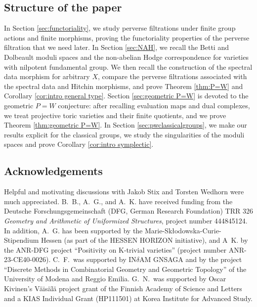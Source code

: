 \documentclass[11pt, a4paper]{amsart}
\theoremstyle{definition}
\theoremstyle{myitemstyle}
\begin{document}
\subsection*{Structure of the paper}
In Section \ref{sec:functoriality}, we study perverse filtrations under finite group actions and finite morphisms, proving the functoriality properties of the perverse filtration that we need later. In Section \ref{sec:NAH}, we recall the Betti and Dolbeault moduli spaces and the non-abelian Hodge correspondence for varieties with nilpotent fundamental group. We then recall the construction of the spectral data morphism for arbitrary $X$, compare the perverse filtrations associated with the spectral data and Hitchin morphisms, and prove Theorem \ref{thm:P=W} and Corollary \ref{cor:intro general type}. Section \ref{sec:geometric P=W} is devoted to the geometric $P=W$ conjecture: after recalling evaluation maps and dual complexes, we treat projective toric varieties and their finite quotients, and we prove Theorem \ref{thm:geometric P=W}. In Section \ref{sec:pwclassicalgroups}, we make our results explicit for the classical groups, we study the singularities of the moduli spaces and prove Corollary \ref{cor:intro symplectic}.

\subsection*{Acknowledgements}
Helpful and motivating discussions with Jakob Stix and Torsten Wedhorn were much appreciated. 
B.~B., A.~G., and A.~K. have  received funding from the Deutsche For\-schungs\-gemeinschaft (DFG, German Research Foundation) TRR 326 \emph{Geometry and Arithmetic of Uniformized Structures}, project number 444845124. In addition, A.~G. has been supported by the Marie-Sk\l{}odowska-Curie-Stipendium Hessen (as part of the HESSEN HORIZON initiative), and A~K. by  the ANR-DFG project “Positivity
on K-trivial varieties” (project number ANR-23-CE40-0026).
C.\ F.\ was supported by IN$\delta$AM GNSAGA and by the project “Discrete Methods in Combinatorial Geometry and Geometric Topology” of the University of Modena and Reggio Emilia.
G.\ N.\ was supported by Oscar Kivinen's Väisälä project grant of the Finnish Academy of Science and Letters and a KIAS Individual Grant (HP111501) at Korea Institute for Advanced Study.

\renewcommand{\thetheorem}{\arabic{section}.\arabic{theorem}}

\end{document}
